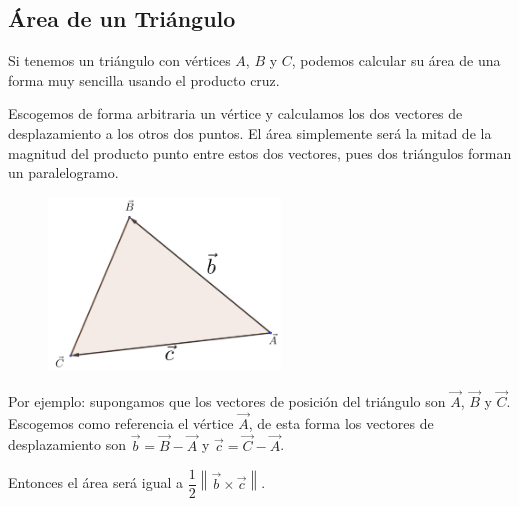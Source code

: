 \documentclass[12pt, fleqn]{report}                             %
\theoremstyle{break}                                            %
\newcommand{\Abs}[1]{\left\lVert #1 \right\lVert}               %
\begin{document}
            \subsection{Área de un Triángulo}
            
                Si tenemos un triángulo con vértices $A$, $B$ y $C$, podemos calcular su área de una forma muy
                sencilla usando el producto cruz.
                
                Escogemos de forma arbitraria un vértice y calculamos los dos vectores de desplazamiento a los
                otros dos puntos. El área simplemente será la mitad de la magnitud del producto punto entre
                estos dos vectores, pues dos triángulos forman un paralelogramo.

                \begin{figure}[H]
                    \centering
                    \includegraphics[width=0.55\textwidth]{triangle}
                \end{figure}
                
                Por ejemplo: supongamos que los vectores de posición del triángulo son $\vec{A}$, $\vec{B}$ y $\vec{C}$.
                Escogemos como referencia el vértice $\vec{A}$, de esta forma los vectores de desplazamiento son
                $\vec{b} = \vec{B}-\vec{A}$ y $\vec{c} = \vec{C}-\vec{A}$.

                Entonces el área será igual a $\dfrac{1}{2}\Abs{\vec{b} \times \vec{c}}$.
            
            \clearpage
\end{document}
